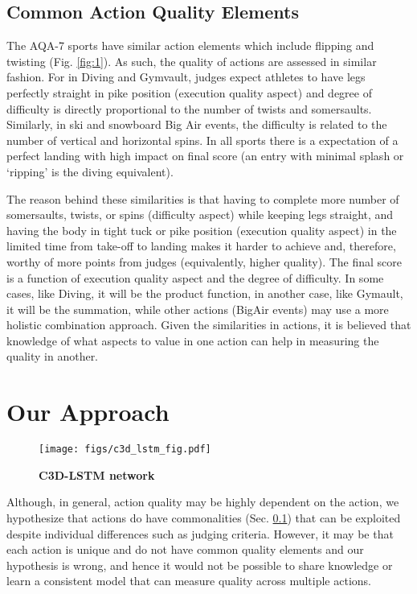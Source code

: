 \documentclass[10pt,twocolumn,letterpaper]{article}
\begin{document}
\subsection{Common Action Quality Elements}
\label{common_aq_elements}
The AQA-7 sports have similar action elements which include flipping and twisting (Fig. \ref{fig:1}).  As such, the quality of actions are assessed in similar fashion.  For \eg in Diving and Gymvault, judges expect athletes to have legs perfectly straight in pike position (execution quality aspect) and degree of difficulty is directly proportional to the number of twists and somersaults.  Similarly, in ski and snowboard Big Air events, the difficulty is related to the number of vertical and horizontal spins.  In all sports there is a expectation of a perfect landing with high impact on final score (an entry with minimal splash or `ripping' is the diving equivalent).  

The reason behind these similarities is that having to complete more number of somersaults, twists, or spins (difficulty aspect) while keeping legs straight, and having the body in tight tuck or pike position (execution quality aspect) in the limited time from take-off to landing makes it harder to achieve and, therefore, worthy of more points from judges (equivalently, higher quality). The final score is a function of execution quality aspect and the degree of difficulty.  In some cases, like Diving, it will be the product function, in another case, like Gymault, it will be the summation, while other actions (BigAir events) may use a more holistic combination approach. Given the similarities in actions, it is believed that knowledge of what aspects to value in one action can help in measuring the quality in another. 
\section{Our Approach}
\begin{figure}[]
\texttt{[image: figs/c3d\_lstm\_fig.pdf]}
\caption{\textbf{\textsc{C3D-LSTM} network}}
\label{fig_c3d_lstm}
\end{figure}
 Although, in general, action quality may be highly dependent on the action, we hypothesize that actions do have commonalities (Sec. \ref{common_aq_elements}) that can be exploited despite individual differences such as judging criteria. However, it may be that each action is unique and do not have common quality elements and our hypothesis is wrong, and hence it would not be possible to share knowledge or learn a consistent model that can measure quality across multiple actions.
\end{document}
